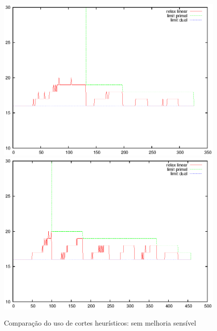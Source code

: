 \documentclass[11pt]{article}
\begin{document}
\begin{figure}[htb]
\centering
\includegraphics[scale=0.5]{lin105_60-f00}%
\includegraphics[scale=0.5]{lin105_60-f01}
\caption{Comparação do uso de cortes heurísticos: sem melhoria sensível}
\label{fig:lin105_60f}
\end{figure}
\end{document}

